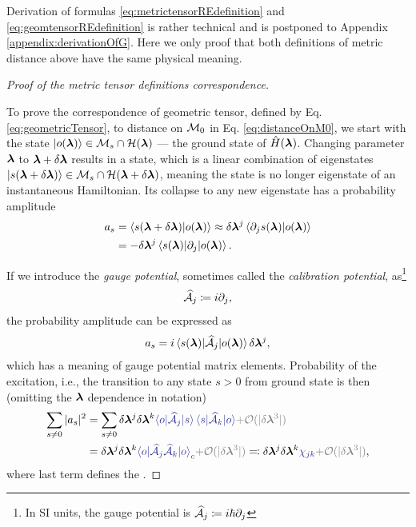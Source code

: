 Derivation of formulas \ref{eq:metrictensorREdefinition} and \ref{eq:geomtensorREdefinition} is rather technical and is postponed to Appendix \ref{appendix:derivationOfG}. Here we only proof that both definitions of metric distance above have the same physical meaning.

\begin{proof}[Proof of the  metric tensor definitions correspondence]\
    \label{sec:derivationOfGeometricTensor}

    To prove the correspondence of geometric tensor, defined by Eq. \ref{eq:geometricTensor}, to distance on $\M_0$ in Eq. \ref{eq:distanceOnM0}, we start with the state $\ket{o(\llambda)}\in \M_s\cap\H(\llambda)$ — the ground state of $\HH(\llambda)$. Changing parameter $\llambda$ to $\llambda+\delta \llambda$ results in a state, which is a linear combination of eigenstates $\ket{s(\llambda+\delta \llambda)}\in \M_s\cap\H(\llambda+\delta \llambda)$, meaning the state is no longer eigenstate of an instantaneous Hamiltonian. Its collapse to any new eigenstate has a probability amplitude
    \begin{equation}
        \begin{split}
            a_s&=\braket{s(\llambda+\delta\llambda)|o(\llambda)}\approx \delta\llambda^j\braket{\partial_j s(\llambda)|o(\llambda)} \\
            &= -\delta\llambda^j\braket{s(\llambda)|\partial_j|o(\llambda)}.
        \end{split}
    \end{equation}

    If we introduce the \emph{gauge potential}, sometimes called the \emph {calibration potential}, as\footnote{In SI units, the gauge potential is $\AA_j\coloneqq i\hbar\partial_{j}$}
    \begin{equation}
        \AA_j\coloneqq i\partial_{j},
    \end{equation}
    the probability amplitude can be expressed as
    \begin{equation}
    a_s=i\braket{s(\llambda)|\AA_j |o(\llambda)}\delta\llambda^j,
    \label{eq:probabilityOfTransitionIsGauge}
    \end{equation}
    which has a meaning of gauge potential matrix elements. Probability of the excitation, i.e., the transition to any state $s>0$ from ground state is then (omitting the $\llambda$ dependence in notation)
    \begin{equation}
        \begin{split}
            \sum_{s\neq 0}|a_s|^2&=  \sum_{s\neq 0} \delta \llambda^j \delta \llambda^k\bluee{\braket{o|\AA_j|s}\braket{s|\AA_k|o}}\gray{+\O(|\delta \llambda^3|)} \\
            &= \delta \llambda^j \delta \llambda^k\bluee{\braket{o|\AA_j \AA_k|o}_c}\gray{+\O(|\delta \llambda^3|)}\eqqcolon \delta \llambda^j \delta \llambda^k\bluee{\chi_{jk}}\gray{+\O(|\delta \llambda^3|)},
        \end{split}
    \end{equation}
    where last term defines the .
\end{proof}






